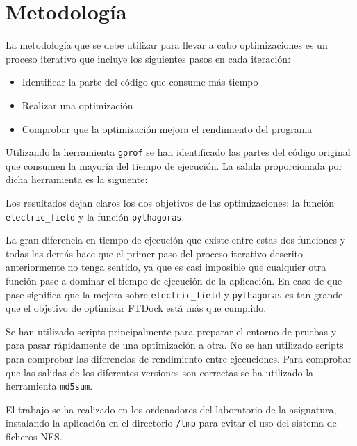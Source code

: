 \section{Metodolog\'{i}a}

La metodolog\'{i}a que se debe utilizar para llevar a cabo optimizaciones es un
proceso iterativo que incluye los siguientes pasos en cada iteraci\'{o}n:

\begin{itemize}
\item Identificar la parte del c\'{o}digo que consume m\'{a}s tiempo
\item Realizar una optimizaci\'{o}n
\item Comprobar que la optimizaci\'{o}n mejora el rendimiento del programa
\end{itemize}

Utilizando la herramienta \texttt{gprof} se han identificado las partes del
c\'{o}digo original que consumen la mayor\'{i}a del tiempo de ejecuci\'{o}n.
La salida proporcionada por dicha herramienta es la siguiente:


Los resultados dejan claros los dos objetivos de las optimizaciones: la
funci\'{o}n \texttt{electric\_field} y la funci\'{o}n \texttt{pythagoras}.

La gran diferencia en tiempo de ejecuci\'{o}n que existe entre estas dos
funciones y todas las dem\'{a}s hace que el primer paso del proceso iterativo
descrito anteriormente no tenga sentido, ya que es casi imposible que cualquier
otra funci\'{o}n pase a dominar el tiempo de ejecuci\'{o}n de la aplicaci\'{o}n.
En caso de que pase significa que la mejora sobre \texttt{electric\_field} y
\texttt{pythagoras} es tan grande que el objetivo de optimizar FTDock est\'{a}
m\'{a}s que cumplido.

Se han utilizado scripts principalmente para preparar el entorno de pruebas y
para pasar r\'{a}pidamente de una optimizaci\'{o}n a otra. No se han utilizado
scripts para comprobar las diferencias de rendimiento entre ejecuciones. Para
comprobar que las salidas de los diferentes versiones son correctas se ha
utilizado la herramienta \texttt{md5sum}.

El trabajo se ha realizado en los ordenadores del laboratorio de la asignatura,
instalando la aplicaci\'{o}n en el directorio \texttt{/tmp} para evitar el uso
del sistema de ficheros NFS.

